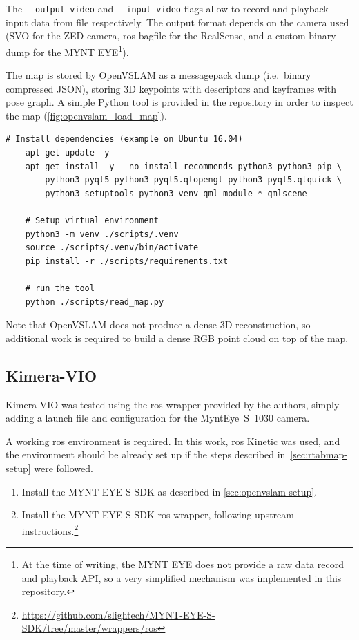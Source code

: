\documentclass[11pt, letterpaper, twoside]{article}
\begin{document}
The \texttt{-{}-output-video} and \texttt{-{}-input-video} flags allow to
record and playback input data from file respectively. The output format
depends on the camera used (SVO for the ZED camera, \gls{ros} bagfile for the
RealSense, and a custom binary dump for the MYNT EYE\footnote{At the time of
writing, the MYNT EYE does not provide a raw data record and playback API,
so a very simplified mechanism was implemented in this repository.}).

The map is stored by OpenVSLAM as a messagepack dump (i.e.\ binary compressed
JSON), storing 3D keypoints with descriptors and keyframes with pose graph. A
simple Python tool is provided in the repository in order to inspect the map
(\cref{fig:openvslam_load_map}).

\begin{Verbatim}[samepage=true]
    # Install dependencies (example on Ubuntu 16.04)
    apt-get update -y
    apt-get install -y --no-install-recommends python3 python3-pip \
        python3-pyqt5 python3-pyqt5.qtopengl python3-pyqt5.qtquick \
        python3-setuptools python3-venv qml-module-* qmlscene

    # Setup virtual environment
    python3 -m venv ./scripts/.venv
    source ./scripts/.venv/bin/activate
    pip install -r ./scripts/requirements.txt

    # run the tool
    python ./scripts/read_map.py
\end{Verbatim}

Note that OpenVSLAM does not produce a dense 3D reconstruction, so additional
work is required to build a dense RGB point cloud on top of the map.

\subsection{Kimera-VIO}\label{sec:kimera-setup}

Kimera-VIO was tested using the \gls{ros} wrapper provided by the authors, simply
adding a launch file and configuration for the MyntEye~S~1030 camera.

A working \gls{ros} environment is required. In this work, \gls{ros} Kinetic
was used, and the environment should be already set up if the steps described
in~\cref{sec:rtabmap-setup} were followed.

\begin{enumerate}
    \item Install the MYNT-EYE-S-SDK as described in \cref{sec:openvslam-setup}.

    \item Install the MYNT-EYE-S-SDK \gls{ros} wrapper, following upstream
        instructions.\footnote{\url{https://github.com/slightech/MYNT-EYE-S-SDK/tree/master/wrappers/ros}}
\end{enumerate}
\end{document}
